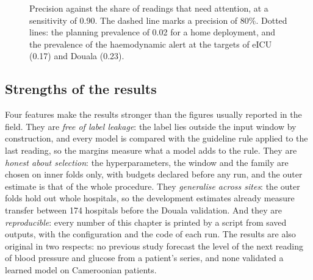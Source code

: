\begin{figure}[htbp]
\centering
{}
\caption{Precision against the share of readings that need attention, at a sensitivity of 0.90. The dashed line marks a precision of 80\%. Dotted lines: the planning prevalence of 0.02 for a home deployment, and the prevalence of the haemodynamic alert at the targets of eICU (0.17) and Douala (0.23).}\label{fig:ppv-prevalence}
\end{figure}

\subsection{Strengths of the results}\label{sec:strengths}

Four features make the results stronger than the figures usually reported in the field. They are \emph{free of label leakage}: the label lies outside the input window by construction, and every model is compared with the guideline rule applied to the last reading, so the margins measure what a model adds to the rule. They are \emph{honest about selection}: the hyperparameters, the window and the family are chosen on inner folds only, with budgets declared before any run, and the outer estimate is that of the whole procedure. They \emph{generalise across sites}: the outer folds hold out whole hospitals, so the development estimates already measure transfer between 174 hospitals before the Douala validation. And they are \emph{reproducible}: every number of this chapter is printed by a script from saved outputs, with the configuration and the code of each run. The results are also original in two respects: no previous study forecast the level of the next reading of blood pressure and glucose from a patient's series, and none validated a learned model on Cameroonian patients.


